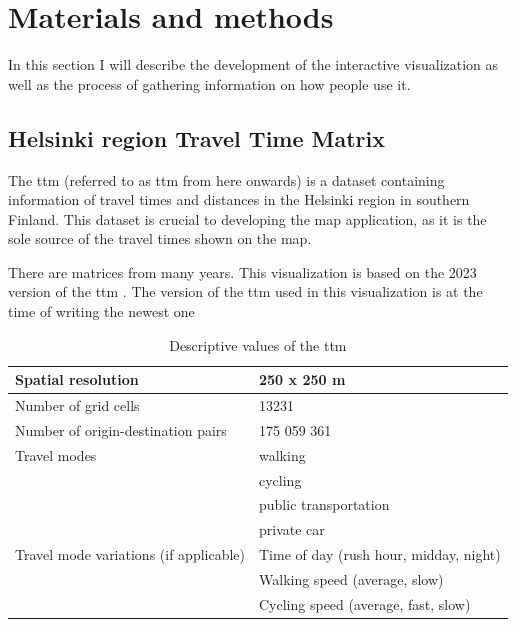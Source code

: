 \section{Materials and methods}
In this section I will describe the development of the interactive visualization
as well as the process of gathering information on how people use it.

\subsection{Helsinki region Travel Time Matrix}

The \acrlong{ttm} (referred to as \acrshort{ttm} from here onwards)
is a dataset containing information of travel times and distances
in the Helsinki region in southern Finland.
This dataset is crucial to developing the map application,
as it is the sole source of the travel times shown on the map.


There are matrices from many years.
This visualization is based on the 2023 version of the \acrshort{ttm}
\parencite{fin2023}.
The version of the \acrshort{ttm} used in this visualization is at the time of writing the newest one

\begin{table}[H]
	\caption{Descriptive values of the \acrshort{ttm} \parencite{fin2023}}
	\label{tab:ttm indicators}
	\centering
	\begin{tabular}{ | L{0.4\textwidth} | L{0.5\textwidth} | }
		\hline
		Spatial resolution
		& 250 x 250 m
		\\
		\hline
		Number of grid cells
		& 13231
		\\
		\hline
		Number of origin-destination pairs
		& 175 059 361
		\\
		\hline
		Travel modes
		& \tabitem walking \\
		& \tabitem cycling \\
		& \tabitem public transportation \\
		& \tabitem private car \\
		\hline
		Travel mode variations (if applicable)
		& \tabitem Time of day (rush hour, midday, night) \\
		& \tabitem Walking speed (average, slow) \\
		& \tabitem Cycling speed (average, fast, slow) \\
		\hline
	\end{tabular}
\end{table}

